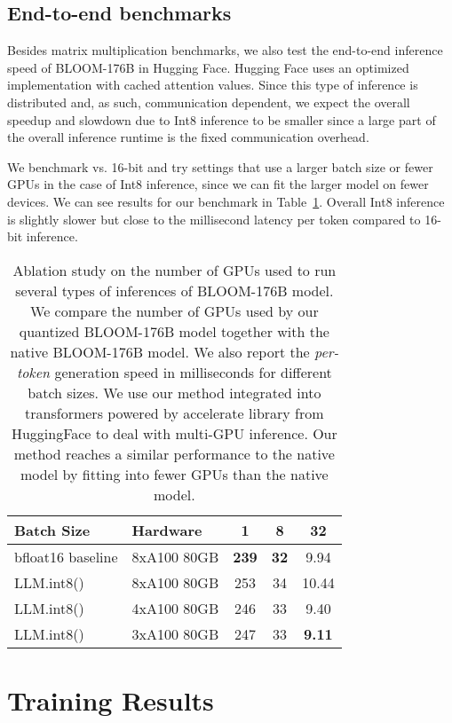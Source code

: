 \documentclass{article}
\begin{document}
\subsection{End-to-end benchmarks}

Besides matrix multiplication benchmarks, we also test the end-to-end inference speed of BLOOM-176B in Hugging Face. Hugging Face uses an optimized implementation with cached attention values. Since this type of inference is distributed and, as such, communication dependent, we expect the overall speedup and slowdown due to Int8 inference to be smaller since a large part of the overall inference runtime is the fixed communication overhead. 

We benchmark vs. 16-bit and try settings that use a larger batch size or fewer GPUs in the case of Int8 inference, since we can fit the larger model on fewer devices.
We can see results for our benchmark in Table~\ref{tbl:memory_footprint}. Overall Int8 inference is slightly slower but close to the millisecond latency per token compared to 16-bit inference. 


\begin{table}[h]
\centering
\caption{Ablation study on the number of GPUs used to run several types of inferences of BLOOM-176B model. We compare the number of GPUs used by our quantized BLOOM-176B model together with the native BLOOM-176B model. We also report the \textit{per-token} generation speed in milliseconds for different batch sizes. We use our method integrated into transformers\citep{wolf2019huggingface} powered by accelerate library from HuggingFace to deal with multi-GPU inference. Our method reaches a similar performance to the native model by fitting into fewer GPUs than the native model.}
\label{tbl:memory_footprint}
\begin{tabular}{llccc}\toprule
Batch Size              & Hardware  & 1 & 8 & 32  \\\toprule
bfloat16 baseline           & 8xA100 80GB & \textbf{239} & \textbf{32}  & 9.94  \\\midrule
LLM.int8()     & 8xA100 80GB    & 253 & 34  & 10.44  \\
LLM.int8()       & 4xA100 80GB    & 246 & 33  & 9.40  \\
LLM.int8()      & 3xA100 80GB    & 247 & 33  & \textbf{9.11} \\\bottomrule
\end{tabular}
\end{table}


\section{Training Results}
\label{appendix:training}
\end{document}
